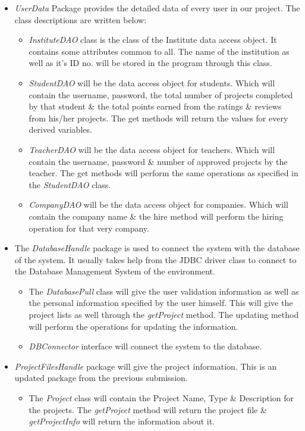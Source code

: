 \documentclass{scrreprt}
\begin{document}
\begin{itemize}
\item \emph{UserData} Package provides the detailed data of every user in our project. The class descriptions are written below:
\begin{itemize}
\item \emph{InstituteDAO} class is the class of the Institute data access object. It contains some attributes common to all. The name of the institution as well as it's ID no. will be stored in the program through this class.
\item \emph{StudentDAO} will be the data access object for students. Which will contain the username, password, the total number of projects completed by that student \& the total points earned from the ratings \& reviews from his/her projects. The get methods will return the values for every derived variables.
\item \emph{TeacherDAO} will be the data access object for teachers. Which will contain the username, password \& number of approved projects by the teacher. The get methods will perform the same operations as specified in the \emph{StudentDAO} class.
\item \emph{CompanyDAO} will be the data access object for companies. Which will contain the company name \& the hire method will perform the hiring operation for that very company.
\end{itemize}
\item The \emph{DatabaseHandle} package is used to connect the system with the database of the system. It usually takes help from the JDBC driver class to connect to the Database Management System of the environment.
\begin{itemize}
\item The \emph{DatabasePull} class will give the user validation information as well as the personal information specified by the user himself. This will give the project lists as well through the \emph{getProject} method. The updating method will perform the operations for updating the information.
\item \emph{DBConnector} interface will connect the system to the database.
\end{itemize}
\item \emph{ProjectFilesHandle} package will give the project information. This is an updated package from the previous submission.
\begin{itemize}
\item The \emph{Project} class will contain the Project Name, Type \& Description for the projects. The \emph{getProject} method will return the project file \& \emph{getProjectInfo} will return the information about it. 
\end{itemize}
\end{itemize}
\end{document}
